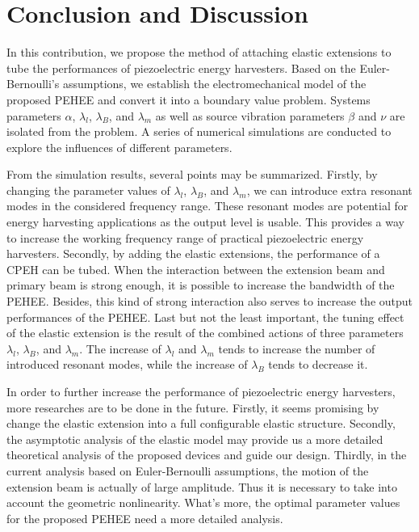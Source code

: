 \documentclass{elsarticle}
\begin{document}
\section{Conclusion and Discussion}

In this contribution, we propose the method of attaching elastic extensions to tube the performances of piezoelectric energy harvesters. Based on the Euler-Bernoulli's assumptions, we establish the electromechanical model of the proposed PEHEE and convert it into a boundary value problem. Systems parameters $\alpha$, $\lambda_l$, $\lambda_B$, and $\lambda_m$ as well as source vibration parameters $\beta$ and $\nu$ are isolated from the problem. A series of numerical simulations are conducted to explore the influences of different parameters. 

From the simulation results, several points may be summarized. Firstly, by changing the parameter values of $\lambda_l$, $\lambda_B$, and $\lambda_m$, we can introduce extra resonant modes in the considered frequency range. These resonant modes are potential for energy harvesting applications as the output level is usable. This provides a way to increase the working frequency range of practical piezoelectric energy harvesters. Secondly, by adding the elastic extensions, the performance of a CPEH can be tubed. When the interaction between the extension beam and primary beam is strong enough, it is possible to increase the bandwidth of the PEHEE. Besides, this kind of strong interaction also serves to increase the output performances of the PEHEE. Last but not the least important, the tuning effect of the elastic extension is the result of the combined actions of three parameters $\lambda_l$, $\lambda_B$, and $\lambda_m$. The increase of $\lambda_l$ and $\lambda_m$ tends to increase the number of introduced resonant modes, while the increase of $\lambda_B$ tends to decrease it.

In order to further increase the performance of piezoelectric energy harvesters, more researches are to be done in the future. Firstly, it seems promising by change the elastic extension into a full configurable elastic structure. Secondly, the asymptotic analysis of the elastic model may provide us a more detailed theoretical analysis of the proposed devices and guide our design. Thirdly, in the current analysis based on Euler-Bernoulli assumptions, the motion of the extension beam is actually of large amplitude. Thus it is necessary to take into account the geometric nonlinearity. What's more, the optimal parameter values for the proposed PEHEE need a more detailed analysis.
\end{document}
